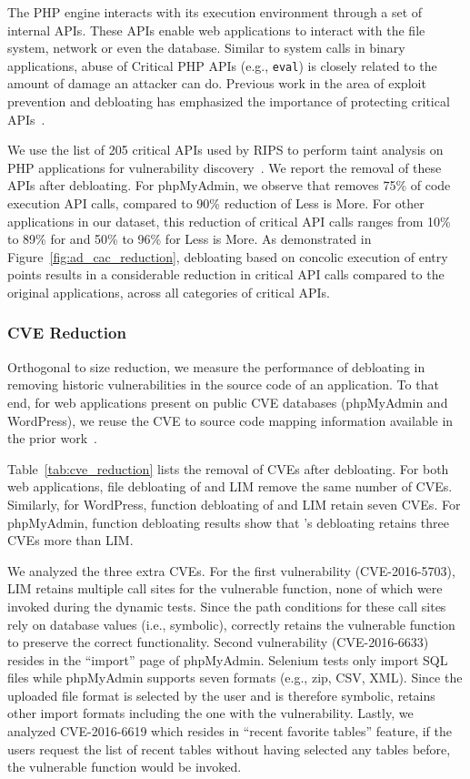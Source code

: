 {The PHP engine interacts with its execution environment through a set of internal APIs. 
These APIs enable web applications to interact with the file system, network or even the database. 
Similar to system calls in binary applications, abuse of Critical PHP APIs (e.g., \texttt{eval}) is closely related to the amount of damage an attacker can do. 
Previous work in the area of exploit prevention and debloating has emphasized the importance of protecting critical APIs~\cite{Mishra2018, pappas2012kbouncer, fratric2012ropguard, bulekov2021saphire}. 

We use the list of 205 critical APIs used by RIPS to perform taint analysis on PHP applications for vulnerability discovery~\cite{dahse2010rips}. 
We report the removal of these APIs after debloating. 
For phpMyAdmin, we observe that \animatedead{} removes 75\% of code execution API calls, compared to 90\% reduction of Less is More. 
For other applications in our dataset, this reduction of critical API calls ranges from 10\% to 89\% for \animatedead{} and 50\% to 96\% for Less is More. 
As demonstrated in Figure~\ref{fig:ad_cac_reduction}, debloating based on concolic execution of entry points results in a considerable reduction in critical API calls compared to the original applications, across all categories of critical APIs. 

\subsubsection*{CVE Reduction}
Orthogonal to size reduction, we measure the performance of debloating in removing historic vulnerabilities in the source code of an application. 
To that end, for web applications present on public CVE databases (phpMyAdmin and WordPress), we reuse the CVE to source code mapping information available in the prior work~\cite{azad2019less}.

Table~\ref{tab:cve_reduction} lists the removal of CVEs after debloating. 
For both web applications, file debloating of \animatedead{} and LIM remove the same number of CVEs. 
Similarly, for WordPress, function debloating of \animatedead{} and LIM retain seven CVEs. 
For phpMyAdmin, function debloating results show that \animatedead{}'s debloating retains three CVEs more than LIM. 

We analyzed the three extra CVEs. 
For the first vulnerability (CVE-2016-5703), LIM retains multiple call sites for the vulnerable function, none of which were invoked during the dynamic tests. 
Since the path conditions for these call sites rely on database values (i.e., symbolic), \animatedead{} correctly retains the vulnerable function to preserve the correct functionality. 
Second vulnerability (CVE-2016-6633) resides in the ``import'' page of phpMyAdmin. 
Selenium tests only import SQL files while phpMyAdmin supports seven formats (e.g., zip, CSV, XML). 
Since the uploaded file format is selected by the user and is therefore symbolic, \animatedead{} retains other import formats including the one with the vulnerability. 
Lastly, we analyzed CVE-2016-6619 which resides in ``recent favorite tables'' feature, if the users request the list of recent tables without having selected any tables before, the vulnerable function would be invoked. 

}
